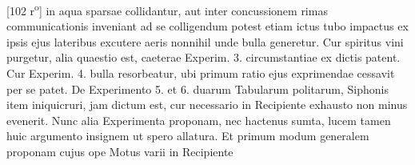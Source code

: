 [102 r\textsuperscript{o}]  in aqua sparsae collidantur, aut inter concussionem  rimas communicationis inveniant ad se colligendum  potest etiam ictus tubo impactus ex ipsis ejus  lateribus excutere aeris nonnihil unde bulla generetur.  Cur  spiritus vini\protect{}  purgetur, alia quaestio est, caeterae Experim. 3.  circumstantiae ex dictis patent. Cur Experim. 4.  bulla resorbeatur, ubi primum ratio ejus exprimendae  cessavit per se patet. De Experimento 5. et 6.  duarum Tabularum politarum\protect{}, Siphonis\protect{} item  iniquicruri, jam dictum est, cur necessario in  Recipiente exhausto non minus evenerit.
\pend  
                  \pstart Nunc alia Experimenta proponam,  nec hactenus  sumta, lucem\protect{} tamen huic argumento insignem  ut spero allatura. Et primum modum generalem  proponam cujus ope Motus varii in Recipiente 
